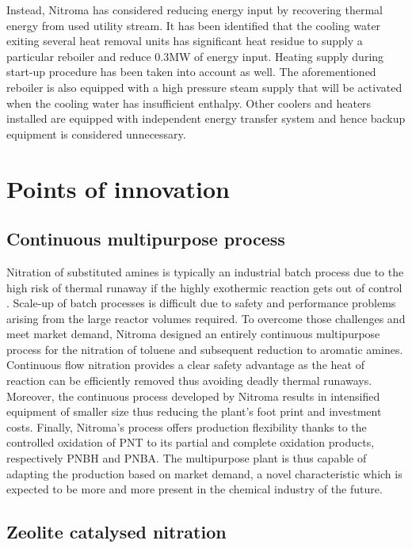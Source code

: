  Instead, Nitroma has considered reducing energy input by recovering thermal energy from used utility stream. It has been identified that the cooling water exiting several heat removal units has significant heat residue to supply a particular reboiler and reduce 0.3MW of energy input. Heating supply during start-up procedure has been taken into account as well. The aforementioned reboiler is also equipped with a high pressure steam supply that will be activated when the cooling water has insufficient enthalpy. Other coolers and heaters installed are equipped with independent energy transfer system and hence backup equipment is considered unnecessary.

\section{Points of innovation}

\subsection{Continuous multipurpose process}
Nitration of substituted amines is typically an industrial batch process due to the high risk of thermal runaway if the highly exothermic reaction gets out of control \cite{dugal_nitrobenzene_2005}. Scale-up of batch processes is difficult due to safety and performance problems arising from the large reactor volumes required. To overcome those challenges and meet market demand, Nitroma designed an entirely continuous multipurpose process for the nitration of toluene and subsequent reduction to aromatic amines. Continuous flow nitration provides a clear safety advantage as the heat of reaction can be efficiently removed thus avoiding deadly thermal runaways. Moreover, the continuous process developed by Nitroma results in intensified equipment of smaller size thus reducing the plant's foot print and investment costs. Finally, Nitroma's process offers production flexibility thanks to the controlled oxidation of PNT to its partial and complete oxidation products, respectively PNBH and PNBA. The multipurpose plant is thus capable of adapting the production based on market demand, a novel characteristic which is expected to be more and more present in the chemical industry of the future.

\subsection{Zeolite catalysed nitration}

